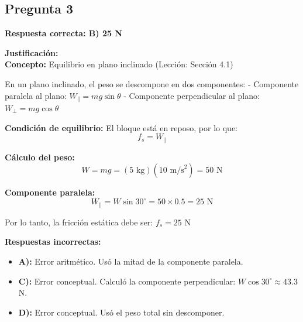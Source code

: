 \newpage
\begin{respuestabox}
\subsection{Pregunta 3}
\textcolor{verdecorrecto}{\textbf{Respuesta correcta: B) 25 N}}

\textbf{Justificación:}\\
\textbf{Concepto:} Equilibrio en plano inclinado (Lección: Sección 4.1)

En un plano inclinado, el peso se descompone en dos componentes:
- Componente paralela al plano: $W_{\parallel} = mg \sin\theta$
- Componente perpendicular al plano: $W_{\perp} = mg \cos\theta$

\textbf{Condición de equilibrio:} El bloque está en reposo, por lo que:
$$f_s = W_{\parallel}$$

\textbf{Cálculo del peso:}
$$W = mg = (5 \text{ kg})(10 \text{ m/s}^2) = 50 \text{ N}$$

\textbf{Componente paralela:}
$$W_{\parallel} = W \sin 30^\circ = 50 \times 0.5 = 25 \text{ N}$$

Por lo tanto, la fricción estática debe ser: $f_s = 25$ N

\textbf{Respuestas incorrectas:}
\begin{itemize}
    \item \textbf{A):} Error aritmético. Usó la mitad de la componente paralela.
    \item \textbf{C):} Error conceptual. Calculó la componente perpendicular: $W \cos 30^\circ \approx 43.3$ N.
    \item \textbf{D):} Error conceptual. Usó el peso total sin descomponer.
\end{itemize}
\end{respuestabox}

